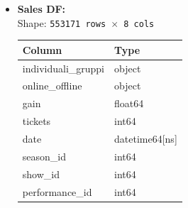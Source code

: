 \documentclass{Configuration_Files/PoliMi3i_thesis}
\begin{document}
\begin{itemize}
  \item \textbf{Sales DF:}\\[-0.5ex]
        Shape: \texttt{553171 rows $\times$ 8 cols}\\[1ex]
        \begin{tabular}{@{}ll@{}}
          \toprule
          \textbf{Column}            & \textbf{Type}     \\
          \midrule
          individuali\_gruppi        & object            \\
          online\_offline            & object            \\
          gain                       & float64           \\
          tickets                    & int64             \\
          date                       & datetime64[ns]    \\
          season\_id                 & int64             \\
          show\_id                   & int64             \\
          performance\_id            & int64             \\
          \bottomrule
        \end{tabular}


\end{itemize}
\end{document}
